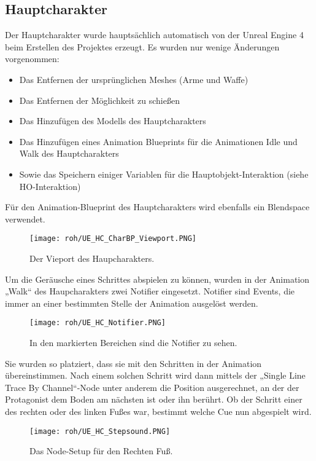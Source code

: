 \subsection{Hauptcharakter}
Der Hauptcharakter wurde hauptsächlich automatisch von der Unreal Engine 4 beim Erstellen des Projektes erzeugt. Es wurden nur wenige Änderungen vorgenommen:
\begin{itemize}
    \item Das Entfernen der ursprünglichen Meshes (Arme und Waffe)
    \item Das Entfernen der Möglichkeit zu schießen
    \item Das Hinzufügen des Modells des Hauptcharakters
    \item Das Hinzufügen eines Animation Blueprints für die Animationen Idle und Walk des Hauptcharakters
    \item Sowie das Speichern einiger Variablen für die Hauptobjekt-Interaktion (siehe HO-Interaktion)
\end{itemize}
Für den Animation-Blueprint des Hauptcharakters wird ebenfalls ein Blendspace verwendet.
\begin{figure}[H]
    \centering
    \texttt{[image: roh/UE\_HC\_CharBP\_Viewport.PNG]}
    \caption{Der Vieport des Haupcharakters.}
    \label{UE:HC_CharBP_Viewport}
\end{figure}
Um die Geräusche eines Schrittes abspielen zu können, wurden in der Animation „Walk“ des Haupcharakters zwei Notifier eingesetzt. Notifier sind Events, die immer an einer bestimmten Stelle der Animation ausgelöst werden.
\begin{figure}[H]
    \centering
    \texttt{[image: roh/UE\_HC\_Notifier.PNG]}
    \caption{In den markierten Bereichen sind die Notifier zu sehen.}
    \label{UE:HC_Notifier}
\end{figure}
Sie wurden so platziert, dass sie mit den Schritten in der Animation übereinstimmen. Nach einem solchen Schritt wird dann mittels der „Single Line Trace By Channel“-Node unter anderem die Position ausgerechnet, an der der Protagonist dem Boden am nächsten ist oder ihn berührt.
Ob der Schritt einer des rechten oder des linken Fußes war, bestimmt welche Cue nun abgespielt wird.
\begin{figure}[H]
    \centering
    \texttt{[image: roh/UE\_HC\_Stepsound.PNG]}
    \caption{Das Node-Setup für den Rechten Fuß.}
    \label{UE:HC_Stepsound}
\end{figure}
